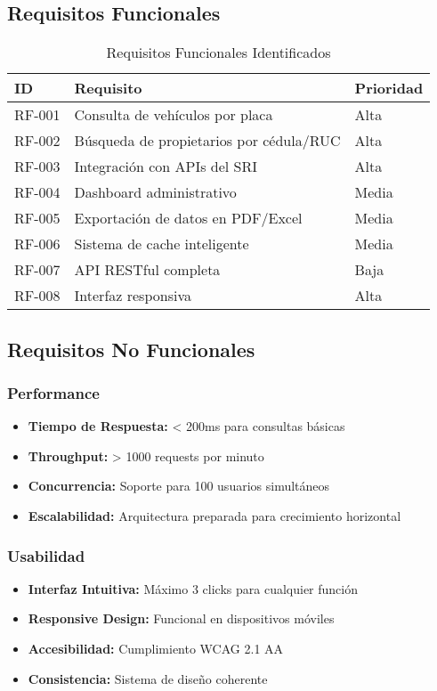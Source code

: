 \documentclass[12pt,a4paper]{article}
\begin{document}
\subsection{Requisitos Funcionales}

\begin{table}[h]
\centering
\begin{tabularx}{\textwidth}{|l|X|l|}
\hline
\textbf{ID} & \textbf{Requisito} & \textbf{Prioridad} \\
\hline
RF-001 & Consulta de vehículos por placa & Alta \\
\hline
RF-002 & Búsqueda de propietarios por cédula/RUC & Alta \\
\hline
RF-003 & Integración con APIs del SRI & Alta \\
\hline
RF-004 & Dashboard administrativo & Media \\
\hline
RF-005 & Exportación de datos en PDF/Excel & Media \\
\hline
RF-006 & Sistema de cache inteligente & Media \\
\hline
RF-007 & API RESTful completa & Baja \\
\hline
RF-008 & Interfaz responsiva & Alta \\
\hline
\end{tabularx}
\caption{Requisitos Funcionales Identificados}
\end{table}

\subsection{Requisitos No Funcionales}

\subsubsection{Performance}
\begin{itemize}
    \item \textbf{Tiempo de Respuesta:} < 200ms para consultas básicas
    \item \textbf{Throughput:} > 1000 requests por minuto
    \item \textbf{Concurrencia:} Soporte para 100 usuarios simultáneos
    \item \textbf{Escalabilidad:} Arquitectura preparada para crecimiento horizontal
\end{itemize}

\subsubsection{Usabilidad}
\begin{itemize}
    \item \textbf{Interfaz Intuitiva:} Máximo 3 clicks para cualquier función
    \item \textbf{Responsive Design:} Funcional en dispositivos móviles
    \item \textbf{Accesibilidad:} Cumplimiento WCAG 2.1 AA
    \item \textbf{Consistencia:} Sistema de diseño coherente
\end{itemize}
\end{document}
